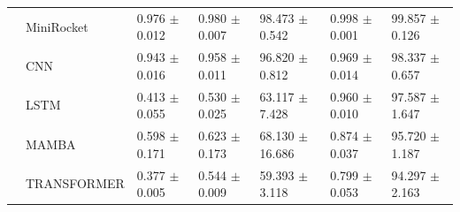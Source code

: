 \begin{table}
\begin{tabular}{lllllll}
    & MiniRocket &  0.976 $\pm$ 0.012 &  0.980 $\pm$ 0.007 &   98.473 $\pm$ 0.542 &  0.998 $\pm$ 0.001 &   99.857 $\pm$ 0.126 \\
    & CNN &  0.943 $\pm$ 0.016 &  0.958 $\pm$ 0.011 &   96.820 $\pm$ 0.812 &  0.969 $\pm$ 0.014 &   98.337 $\pm$ 0.657 \\
    & LSTM &  0.413 $\pm$ 0.055 &  0.530 $\pm$ 0.025 &   63.117 $\pm$ 7.428 &  0.960 $\pm$ 0.010 &   97.587 $\pm$ 1.647 \\
    & MAMBA &  0.598 $\pm$ 0.171 &  0.623 $\pm$ 0.173 &  68.130 $\pm$ 16.686 &  0.874 $\pm$ 0.037 &   95.720 $\pm$ 1.187 \\
    & TRANSFORMER &  0.377 $\pm$ 0.005 &  0.544 $\pm$ 0.009 &   59.393 $\pm$ 3.118 &  0.799 $\pm$ 0.053 &   94.297 $\pm$ 2.163 \\
\bottomrule
\end{tabular}
\end{table}
